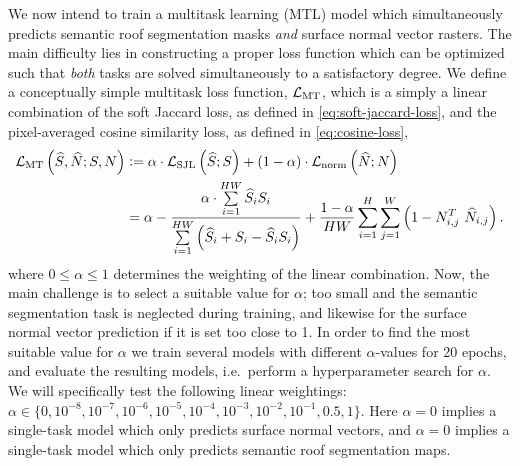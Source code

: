 We now intend to train a multitask learning (MTL) model which simultaneously predicts semantic roof segmentation masks \emph{and} surface normal vector rasters.
The main difficulty lies in constructing a proper loss function which can be optimized such that \emph{both} tasks are solved simultaneously to a satisfactory degree.
We define a conceptually simple multitask loss function, $\mathcal{L}_{\mathrm{MT}}$, which is a simply a linear combination of the soft Jaccard loss, as defined in \cref{eq:soft-jaccard-loss}, and the pixel-averaged cosine similarity loss, as defined in \cref{eq:cosine-loss},
\begin{align*}
  \mtlossf
  &\defeq
  \alpha \cdot \seglossf
  +
  (1 - \alpha) \cdot \normlossf
  \\
  &=
  \alpha - \frac{%
    \alpha \cdot \sum\limits_{i = 1}^{HW}
    \predsegraster_i \segraster_i
  }{%
    \sum\limits_{i = 1}^{HW} \left(
      \predsegraster_i
      +
      \segraster_i
      -
      \predsegraster_i \segraster_i
    \right)
  }
  +
  \frac{1 - \alpha}{HW}
  \sum_{i = 1}^{H} \sum_{j = 1}^{W} \left(
    1 - \normraster_{i,j}^T~\prednormraster_{i,j}
  \right).
\end{align*}
%
where $0 \leq \alpha \leq 1$ determines the weighting of the linear combination.
Now, the main challenge is to select a suitable value for $\alpha$; too small and the semantic segmentation task is neglected during training, and likewise for the surface normal vector prediction if it is set too close to 1.
In order to find the most suitable value for $\alpha$ we train several models with different $\alpha$-values for 20 epochs, and evaluate the resulting models, i.e.\ perform a hyperparameter search for $\alpha$.
We will specifically test the following linear weightings: $\alpha \in \{0,\allowbreak 10^{-8},\allowbreak 10^{-7},\allowbreak 10^{-6},\allowbreak 10^{-5},\allowbreak 10^{-4},\allowbreak 10^{-3},\allowbreak 10^{-2},\allowbreak 10^{-1},\allowbreak 0.5,\allowbreak 1\}$.
Here $\alpha = 0$ implies a single-task model which only predicts surface normal vectors, and $\alpha = 0$ implies a single-task model which only predicts semantic roof segmentation maps.

